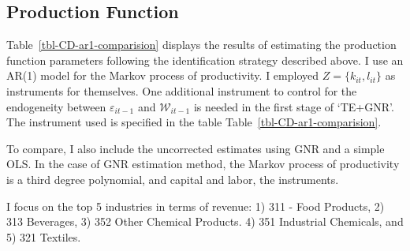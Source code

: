 \documentclass[
  12pt]{article}
\theoremstyle{definition}
\theoremstyle{remark}
\begin{document}
\subsection{Production Function}\label{production-function}

Table~\ref{tbl-CD-ar1-comparision} displays the results of estimating
the production function parameters following the identification strategy
described above. I use an AR(1) model for the Markov process of
productivity. I employed \(Z=\{k_{it},l_{it}\}\) as instruments for
themselves. One additional instrument to control for the endogeneity
between \(\varepsilon_{it-1}\) and \(\mathcal{W}_{it-1}\) is needed in
the first stage of `TE+GNR'. The instrument used is specified in the
table Table~\ref{tbl-CD-ar1-comparision}.

To compare, I also include the uncorrected estimates using GNR and a
simple OLS. In the case of GNR estimation method, the Markov process of
productivity is a third degree polynomial, and capital and labor, the
instruments.

I focus on the top 5 industries in terms of revenue: 1) 311 - Food
Products, 2) 313 Beverages, 3) 352 Other Chemical Products. 4) 351
Industrial Chemicals, and 5) 321 Textiles.
\end{document}
